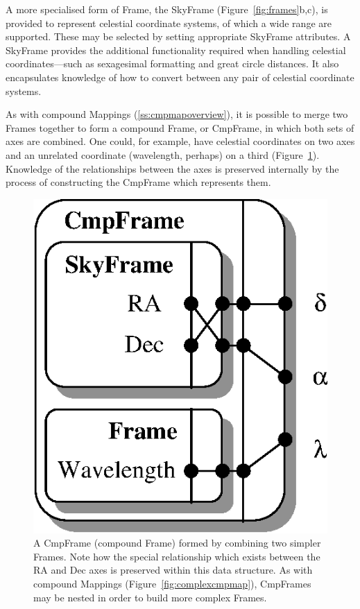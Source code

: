 \documentclass[twoside,11pt]{article}
\newenvironment{latexonly}{}{}
\newcommand{\htmlref}[2]{#1}
\newcommand{\secref}[1]{\S\ref{#1}}
\renewcommand{\secref}[1]{\ref{#1}}
\begin{document}
A more specialised form of Frame, the SkyFrame
(Figure~\ref{fig:frames}b,c), is provided to represent celestial
coordinate systems, of which a wide range are supported.  These may be
selected by setting appropriate SkyFrame attributes.  A SkyFrame
provides the additional functionality required when handling celestial
coordinates---such as sexagesimal formatting and great circle
distances.  It also encapsulates knowledge of how to convert between
any pair of celestial coordinate systems.

\begin{latexonly}
   As with compound Mappings (\secref{ss:cmpmapoverview}), it is possible
   to merge two Frames together to form a compound Frame, or \htmlref{CmpFrame}{CmpFrame}, in
   which both sets of axes are combined.  One could, for example, have
   celestial coordinates on two axes and an unrelated coordinate
   (wavelength, perhaps) on a third (Figure~\ref{fig:cmpframe}).
   Knowledge of the relationships between the axes is preserved
   internally by the process of constructing the CmpFrame which
   represents them.
   \begin{figure}
   \begin{center}
   \includegraphics[scale=0.85]{sun210_figures/cmpframe.eps}
   \caption{A CmpFrame (compound Frame) formed by combining two simpler
   Frames. Note how the special relationship which exists between the RA
   and Dec axes is preserved within this data structure. As with compound
   Mappings (Figure~\ref{fig:complexcmpmap}), CmpFrames may be nested in
   order to build more complex Frames.}
   \label{fig:cmpframe}
   \end{center}
   \end{figure}
\end{latexonly}
\end{document}
